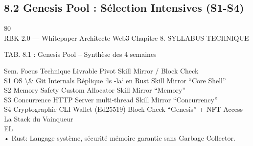 \subsection{8.2 Genesis Pool : Sélection Intensives (S1-S4)}
\vspace{0.5em}
\vspace{0.5em}
80\\
RBK 2.0 — Whitepaper Architecte Web3                                                                                   Chapitre 8. SYLLABUS TECHNIQUE\\
\vspace{0.5em}
\vspace{0.5em}
\vspace{0.5em}
\vspace{0.5em}
\begin{center}\begin{tabular}TAB. 8.1 : Genesis Pool – Synthèse des 4 semaines\end{tabular}\end{center}
\vspace{0.5em}
\vspace{0.5em}
Sem.     Focus Technique        Livrable Pivot                Skill Mirror / Block Check\\
S1       OS \textbackslash{}& Git Internals     Réplique ‘ls -la‘ en Rust     Skill Mirror “Core Shell”\\
S2       Memory Safety          Custom Allocator              Skill Mirror “Memory”\\
S3       Concurrence            HTTP Server multi-thread      Skill Mirror “Concurrency”\\
S4       Cryptographie          CLI Wallet (Ed25519)          Block Check “Genesis” + NFT Access\\
\vspace{0.5em}
\vspace{0.5em}
La Stack du Vainqueur\\
\vspace{0.5em}
\vspace{0.5em}
\vspace{0.5em}
\vspace{0.5em}
EL\\
• Rust: Langage système, sécurité mémoire garantie sans Garbage Collector.\\
\vspace{0.5em}
\vspace{0.5em}
\vspace{0.5em}
\vspace{0.5em}
